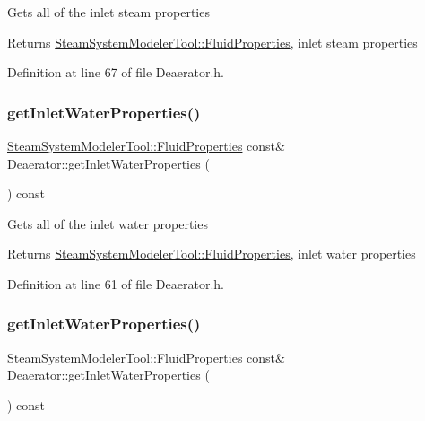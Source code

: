 Gets all of the inlet steam properties \begin{DoxyReturn}{Returns}
\hyperlink{struct_steam_system_modeler_tool_1_1_fluid_properties}{Steam\+System\+Modeler\+Tool\+::\+Fluid\+Properties}, inlet steam properties 
\end{DoxyReturn}


Definition at line 67 of file Deaerator.\+h.

\mbox{\label{class_deaerator_a9138c93cf6643e91ad7ce0de7fb328b7}} 
\subsubsection{\texorpdfstring{get\+Inlet\+Water\+Properties()}{getInletWaterProperties()}\hspace{0.1cm}{\footnotesize\ttfamily [1/3]}}
{\footnotesize\ttfamily \hyperlink{struct_steam_system_modeler_tool_1_1_fluid_properties}{Steam\+System\+Modeler\+Tool\+::\+Fluid\+Properties} const\& Deaerator\+::get\+Inlet\+Water\+Properties (\begin{DoxyParamCaption}{ }\end{DoxyParamCaption}) const\hspace{0.3cm}{\ttfamily [inline]}}

Gets all of the inlet water properties \begin{DoxyReturn}{Returns}
\hyperlink{struct_steam_system_modeler_tool_1_1_fluid_properties}{Steam\+System\+Modeler\+Tool\+::\+Fluid\+Properties}, inlet water properties 
\end{DoxyReturn}


Definition at line 61 of file Deaerator.\+h.

\mbox{\label{class_deaerator_a9138c93cf6643e91ad7ce0de7fb328b7}} 
\subsubsection{\texorpdfstring{get\+Inlet\+Water\+Properties()}{getInletWaterProperties()}\hspace{0.1cm}{\footnotesize\ttfamily [2/3]}}
{\footnotesize\ttfamily \hyperlink{struct_steam_system_modeler_tool_1_1_fluid_properties}{Steam\+System\+Modeler\+Tool\+::\+Fluid\+Properties} const\& Deaerator\+::get\+Inlet\+Water\+Properties (\begin{DoxyParamCaption}{ }\end{DoxyParamCaption}) const\hspace{0.3cm}{\ttfamily [inline]}}

